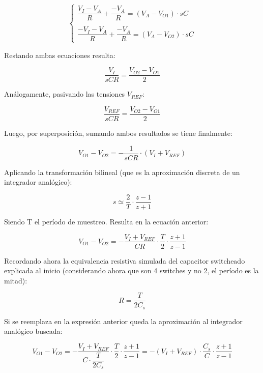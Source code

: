 \documentclass[assd_tp3_main.tex]{subfiles}
\begin{document}
\[
\left\lbrace
\begin{array}{l}
\dfrac{V_I-V_A}{R} + \dfrac{-V_A}{R} = (V_A-V_{O1}) \cdot sC \\
\\
\dfrac{-V_I-V_A}{R} + \dfrac{-V_A}{R} = (V_A-V_{O2}) \cdot sC
\end{array}
\right.
\] 

Restando ambas ecuaciones resulta:

\[
\frac{V_I}{sCR} = \frac{V_{O2}-V_{O1}}{2}
\]

Análogamente, pasivando las tensiones $V_{REF}$:

\[
\frac{V_{REF}}{sCR} = \frac{V_{O2}-V_{O1}}{2}
\]

Luego, por superposición, sumando ambos resultados se tiene finalmente:

\[
V_{O1} - V_{O2} = -\frac{1}{sCR} \cdot (V_I + V_{REF})
\]

Aplicando la transformación bilineal (que es la aproximación discreta de un integrador analógico):

\[
s \simeq \frac{2}{T} \cdot \frac{z-1}{z+1}
\]

Siendo T el período de muestreo. Resulta en la ecuación anterior:

\[
V_{O1}-V_{O2} = -\frac{V_I+V_{REF}}{CR} \cdot \frac{T}{2} \cdot \frac{z+1}{z-1}
\]

Recordando ahora la equivalencia resistiva simulada del capacitor switcheado explicada al inicio (considerando ahora que son 4 switches y no 2, el período es la mitad):

\[
R = \frac{T}{2C_s}
\]

Si se reemplaza en la expresión anterior queda la aproximación al integrador analógico buscada:

\[
V_{O1}-V_{O2} = -\frac{V_I+V_{REF}}{C \cdot \dfrac{T}{2C_s}} \cdot \frac{T}{2} \cdot \frac{z+1}{z-1} = -(V_I + V_{REF}) \cdot \frac{C_s}{C} \cdot \frac{z+1}{z-1}
\]
\end{document}

